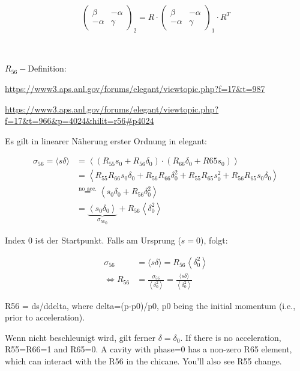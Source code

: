 \documentclass[12pt]{scrreprt}%
\begin{document}
\begin{align*}
\left(
\begin{matrix}
\beta & -\alpha \\
-\alpha & \gamma
\end{matrix}
\right)_2
=
R
\cdot 
\left(
\begin{matrix}
\beta & -\alpha \\
-\alpha & \gamma
\end{matrix}
\right)_1
\cdot 
R^T
\end{align*}
 
~ \newpage ~

$R_{56}-$Definition:

\url{https://www3.aps.anl.gov/forums/elegant/viewtopic.php?f=17&t=987}

\url{https://www3.aps.anl.gov/forums/elegant/viewtopic.php?f=17&t=966&p=4024&hilit=r56#p4024}

\url{}

Es gilt in linearer Näherung erster Ordnung in elegant:

\begin{align*}
\sigma_{56}=\langle s\delta\rangle &=\left\langle\left(R_{55}s_0+R_{56}\delta_0\right)\cdot\left(R_{66}\delta_0+R{65}s_0\right)\right\rangle\\
~ &=\left\langle R_{55}R_{66}s_0\delta_0+R_{56}R_{66}\delta^2_0+R_{55}R_{65}s_0^2+R_{56}R_{65}s_0\delta_0\right\rangle\\
~ &\overset{\text{no acc.}}{=}\left\langle s_0\delta_0+R_{56}\delta_0^2\right\rangle\\
~ &=\underbrace{\left\langle s_0\delta_0\right\rangle}_{{\sigma_{56}}_0}  +   R_{56}\left\langle \delta_0^2\right\rangle
\end{align*}

Index 0 ist der Startpunkt. Falls am Ursprung ($s=0$), folgt:

\begin{align*}
\sigma_{56} &= \langle s\delta\rangle = R_{56}\left\langle \delta_0^2\right\rangle\\
\Leftrightarrow R_{56}  &= \frac{\sigma_{56}}{\left\langle \delta_0^2\right\rangle}=\frac{\langle s\delta\rangle}{\left\langle \delta_0^2\right\rangle}
\end{align*}

R56 = ds/ddelta, where delta=(p-p0)/p0, p0 being the initial momentum (i.e., prior to acceleration).


Wenn nicht beschleunigt wird, gilt ferner $\delta=\delta_0$. If there is no acceleration, R55=R66=1 and R65=0. A cavity with phase=0 has a non-zero R65 element, which can interact with the R56 in the chicane. You'll also see R55 change.
\end{document}
